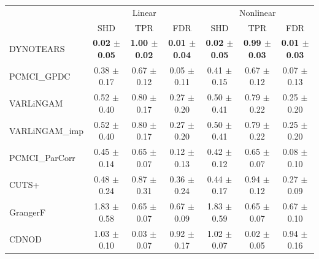 \begin{tabular}{lcccccc}
\toprule
 & \multicolumn{3}{c}{Linear} & \multicolumn{3}{c}{Nonlinear} \\
 & SHD & TPR & FDR & SHD & TPR & FDR \\
\midrule
DYNOTEARS & \textbf{0.02 $\pm$ 0.05} & \textbf{1.00 $\pm$ 0.02} & \textbf{0.01 $\pm$ 0.04} & \textbf{0.02 $\pm$ 0.05} & \textbf{0.99 $\pm$ 0.03} & \textbf{0.01 $\pm$ 0.03} \\
PCMCI\_GPDC & 0.38 $\pm$ 0.17 & 0.67 $\pm$ 0.12 & 0.05 $\pm$ 0.11 & 0.41 $\pm$ 0.15 & 0.67 $\pm$ 0.12 & 0.07 $\pm$ 0.13 \\
VARLiNGAM & 0.52 $\pm$ 0.40 & 0.80 $\pm$ 0.17 & 0.27 $\pm$ 0.20 & 0.50 $\pm$ 0.41 & 0.79 $\pm$ 0.22 & 0.25 $\pm$ 0.20 \\
VARLiNGAM\_imp & 0.52 $\pm$ 0.40 & 0.80 $\pm$ 0.17 & 0.27 $\pm$ 0.20 & 0.50 $\pm$ 0.41 & 0.79 $\pm$ 0.22 & 0.25 $\pm$ 0.20 \\
PCMCI\_ParCorr & 0.45 $\pm$ 0.14 & 0.65 $\pm$ 0.07 & 0.12 $\pm$ 0.13 & 0.42 $\pm$ 0.12 & 0.65 $\pm$ 0.07 & 0.08 $\pm$ 0.10 \\
CUTS+ & 0.48 $\pm$ 0.24 & 0.87 $\pm$ 0.31 & 0.36 $\pm$ 0.24 & 0.44 $\pm$ 0.17 & 0.94 $\pm$ 0.12 & 0.27 $\pm$ 0.09 \\
GrangerF & 1.83 $\pm$ 0.58 & 0.65 $\pm$ 0.07 & 0.67 $\pm$ 0.09 & 1.83 $\pm$ 0.59 & 0.65 $\pm$ 0.07 & 0.67 $\pm$ 0.10 \\
CDNOD & 1.03 $\pm$ 0.10 & 0.03 $\pm$ 0.07 & 0.92 $\pm$ 0.17 & 1.02 $\pm$ 0.07 & 0.02 $\pm$ 0.05 & 0.94 $\pm$ 0.16 \\
\bottomrule
\end{tabular}
